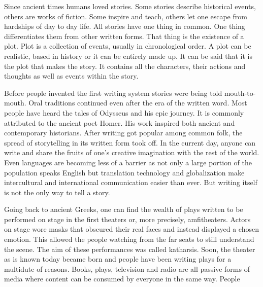 \label{chapter:introduction}
Since ancient times humans loved stories.
Some stories describe historical events, others are works of fiction.
Some inspire and teach, others let one escape from hardships of day to day life.
All stories have one thing in common.
One thing differentiates them from other written forms.
That thing is the existence of a plot.
Plot is a collection of events, usually in chronological order.
A plot can be realistic, based in history or it can be entirely made up.
It can be said that it is the plot that makes the story.
It contains all the characters, their actions and thoughts as well as events within the story.

Before people invented the first writing system stories were being told mouth-to-mouth.
Oral traditions continued even after the era of the written word.
Most people have heard the tales of Odysseus and his epic journey.
It is commonly attributed to the ancient poet Homer.
His work inspired both ancient and contemporary historians\cite{marincola2007odysseus}.
After writing got popular among common folk, the spread of storytelling in its written form took off.
In the current day, anyone can write and share the fruits of one's creative imagination with the rest of the world.
Even languages are becoming less of a barrier as not only a large portion of the population speaks English but translation technology and globalization make intercultural and international communication easier than ever\cite{coulmas1987speak}.
But writing itself is not the only way to tell a story.

Going back to ancient Greeks, one can find the wealth of plays written to be performed on stage in the first theaters or, more precisely, amfitheaters.
Actors on stage wore masks that obscured their real faces and instead displayed a chosen emotion.
This allowed the people watching from the far seats to still understand the scene.
The aim of these performances was called katharsis\cite{hart2010art}.
Soon, the theater as is known today became born and people have been writing plays for a multidute of reasons.
Books, plays, television and radio are all passive forms of media where content can be consumed by everyone in the same way.
People


